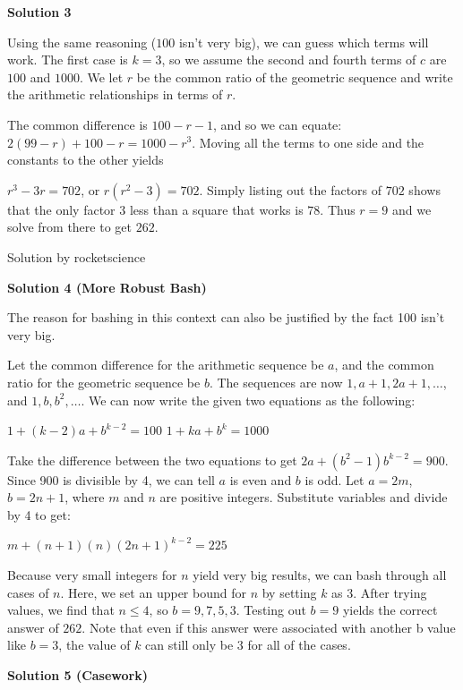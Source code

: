 \begin{enumerate}
\textbf{Solution 3}

Using the same reasoning ($100$ isn't very big), we can guess which terms will work. The first case is $k=3$, so we assume the second and fourth terms of $c$ are $100$ and $1000$. We let $r$ be the common ratio of the geometric sequence and write the arithmetic relationships in terms of $r$.

 The common difference is $100-r - 1$, and so we can equate: $2(99-r)+100-r=1000-r^3$. Moving all the terms to one side and the constants to the other yields

 $r^3-3r = 702$, or $r(r^2-3) = 702$. Simply listing out the factors of $702$ shows that the only factor $3$ less than a square that works is $78$. Thus $r=9$ and we solve from there to get $\boxed{262}$.

 Solution by rocketscience

 



\textbf{Solution 4 (More Robust Bash)}

The reason for bashing in this context can also be justified by the fact 100 isn't very big. 

 Let the common difference for the arithmetic sequence be $a$, and the common ratio for the geometric sequence be $b$. The sequences are now $1, a+1, 2a+1, \ldots$, and $1, b, b^2, \ldots$. We can now write the given two equations as the following:

 $1+(k-2)a+b^{k-2} = 100$
$1+ka+b^k = 1000$

 Take the difference between the two equations to get $2a+(b^2-1)b^{k-2} = 900$. Since 900 is divisible by 4, we can tell $a$ is even and $b$ is odd. Let $a=2m$, $b=2n+1$, where $m$ and $n$ are positive integers. Substitute variables and divide by 4 to get:

 $m+(n+1)(n)(2n+1)^{k-2} = 225$

 Because very small integers for $n$ yield very big results, we can bash through all cases of $n$. Here, we set an upper bound for $n$ by setting $k$ as 3. After trying values, we find that $n\leq 4$, so $b=9, 7, 5, 3$. Testing out $b=9$ yields the correct answer of $\boxed{262}$. Note that even if this answer were associated with another b value like $b=3$, the value of $k$ can still only be 3 for all of the cases.

 



\textbf{Solution 5 (Casework)}


\end{enumerate}
